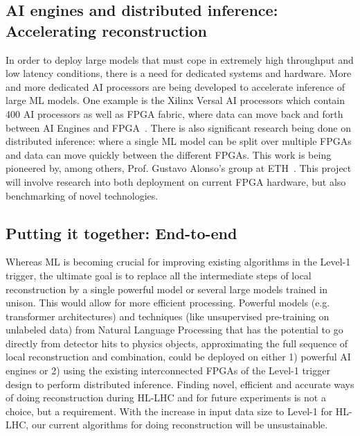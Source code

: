 \documentclass[12pt]{iopart}
\begin{document}
\subsection{AI engines and distributed inference: Accelerating reconstruction}
In order to deploy large models that must cope in extremely high throughput and low latency conditions, there is a need for dedicated systems and hardware. More and more dedicated AI processors are being developed to accelerate inference of large ML models. One example is the Xilinx Versal AI processors which contain 400 AI processors as well as FPGA fabric, where data can move back and forth between AI Engines and FPGA~\cite{XilinxVersalAI}. There is also significant research being done on distributed inference: where a single ML model can be split over multiple FPGAs and data can move quickly between the different FPGAs. This work is being pioneered by, among others, Prof. Gustavo Alonso's group at ETH~\cite{AlonsoWebpage}. This project will involve research into both deployment on current FPGA hardware, but also benchmarking of novel technologies.

\subsection{Putting it together: End-to-end}
Whereas ML is becoming crucial for improving existing algorithms in the Level-1 trigger, the ultimate goal is to replace all the intermediate steps of local reconstruction by a single powerful model or several large models trained in unison. This would allow for more efficient processing. Powerful models (e.g. transformer architectures) and techniques (like unsupervised pre-training on unlabeled data) from Natural Language Processing  that has the potential to go directly from detector hits to physics objects, approximating the full sequence of local reconstruction and combination, could be deployed on either 1) powerful AI engines or 2) using the existing interconnected FPGAs of the Level-1 trigger design to perform distributed inference. Finding novel, efficient and accurate ways of doing reconstruction during HL-LHC and for future experiments is not a choice, but a requirement. With the increase in input data size to Level-1 for HL-LHC, our current algorithms for doing reconstruction will be unsustainable.
\end{document}
